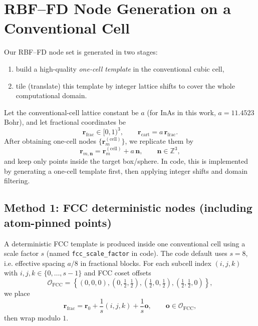 \section{RBF--FD Node Generation on a Conventional Cell}
\label{sec:rbffd-node-generation}

Our RBF--FD node set is generated in two stages:
\begin{enumerate}
  \item build a high-quality \emph{one-cell template} in the conventional cubic cell,
  \item tile (translate) this template by integer lattice shifts to cover the whole computational domain.
\end{enumerate}

Let the conventional-cell lattice constant be $a$ (for InAs in this work, $a=11.4523$ Bohr),
and let fractional coordinates be
\begin{equation}
\mathbf{r}_{\mathrm{frac}}\in[0,1)^3,\qquad
\mathbf{r}_{\mathrm{cart}} = a\,\mathbf{r}_{\mathrm{frac}}.
\end{equation}
After obtaining one-cell nodes $\{\mathbf{r}_m^{(\mathrm{cell})}\}$, we replicate them by
\begin{equation}
\mathbf{r}_{m,\mathbf{n}} = \mathbf{r}_m^{(\mathrm{cell})} + a\,\mathbf{n},
\qquad \mathbf{n}\in\mathbb{Z}^3,
\end{equation}
and keep only points inside the target box/sphere.
In code, this is implemented by generating a one-cell template first, then applying integer shifts and domain filtering.

\subsection{Method 1: FCC deterministic nodes (including atom-pinned points)}

A deterministic FCC template is produced inside one conventional cell using a scale factor $s$ (named
\verb|fcc_scale_factor| in code). The code default uses $s=8$, i.e. effective spacing $a/8$ in fractional blocks.
For each subcell index $(i,j,k)$ with $i,j,k\in\{0,\dots,s-1\}$ and FCC coset offsets
\begin{equation}
\mathcal{O}_{\mathrm{FCC}}=\left\{
(0,0,0),\left(0,\tfrac12,\tfrac12\right),\left(\tfrac12,0,\tfrac12\right),\left(\tfrac12,\tfrac12,0\right)
\right\},
\end{equation}
we place
\begin{equation}
\mathbf{r}_{\mathrm{frac}} = \mathbf{r}_0 + \frac{1}{s}(i,j,k)+\frac{1}{s}\mathbf{o},\qquad \mathbf{o}\in\mathcal{O}_{\mathrm{FCC}},
\end{equation}
then wrap modulo $1$.

